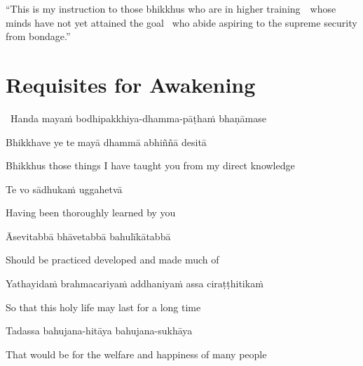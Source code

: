 \suttaRef{[MN 39]}

\begin{english-only-justify}
  ``This is my instruction to those bhikkhus who are in higher \mbox{training}~\breathmark\ whose minds have not yet attained the goal \breathmark\ who abide aspiring to the supreme security from bondage.''
\end{english-only-justify}

\suttaRef{[MN 107]}


\section{Requisites for Awakening}
\label{requisites-for-awakening}

\begin{leader}
  \anglebracketleft\ \hspace{-0.5mm}Handa mayaṁ bodhipakkhiya-dhamma-pāṭhaṁ bhaṇāmase \hspace{-0.5mm}\anglebracketright\
\end{leader}

Bhikkhave ye te mayā dhammā abhiññā desitā

\begin{english}
  Bhikkhus those things I have taught you from my direct knowledge
\end{english}

Te vo sādhukaṁ uggahetvā

\begin{english}
  Having been thoroughly learned by you
\end{english}

Āsevitabbā bhāvetabbā bahulīkātabbā

\begin{english}
  Should be practiced developed and made much of
\end{english}

Yathayidaṁ brahmacariyaṁ addhaniyaṁ assa ciraṭṭhitikaṁ

\begin{english}
  So that this holy life may last for a long time
\end{english}

Tadassa bahujana-hitāya bahujana-sukhāya

\begin{english}
  That would be for the welfare and happiness of many people
\end{english}

